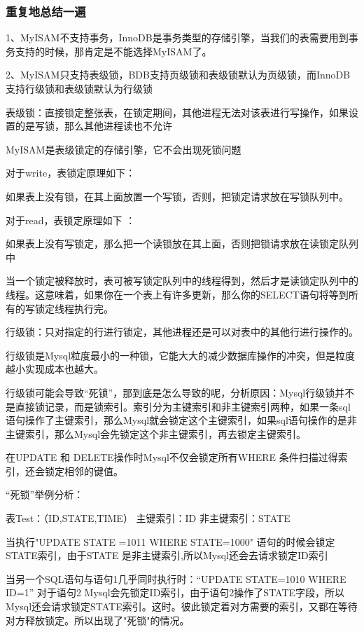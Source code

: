 \documentclass[UTF8]{ctexart}
\begin{document}
 
\subsubsection{重复地总结一遍}

1、MyISAM不支持事务，InnoDB是事务类型的存储引擎，当我们的表需要用到事务支持的时候，那肯定是不能选择MyISAM了。

2、MyISAM只支持表级锁，BDB支持页级锁和表级锁默认为页级锁，而InnoDB支持行级锁和表级锁默认为行级锁
 
表级锁：直接锁定整张表，在锁定期间，其他进程无法对该表进行写操作，如果设置的是写锁，那么其他进程读也不允许
 
MyISAM是表级锁定的存储引擎，它不会出现死锁问题
 
对于write，表锁定原理如下：
 
如果表上没有锁，在其上面放置一个写锁，否则，把锁定请求放在写锁队列中。
 
对于read，表锁定原理如下 ：
 
如果表上没有写锁定，那么把一个读锁放在其上面，否则把锁请求放在读锁定队列中
 
当一个锁定被释放时，表可被写锁定队列中的线程得到，然后才是读锁定队列中的线程。这意味着，如果你在一个表上有许多更新，那么你的SELECT语句将等到所有的写锁定线程执行完。

行级锁：只对指定的行进行锁定，其他进程还是可以对表中的其他行进行操作的。
 
行级锁是Mysql粒度最小的一种锁，它能大大的减少数据库操作的冲突，但是粒度越小实现成本也越大。
 
行级锁可能会导致“死锁”，那到底是怎么导致的呢，分析原因：Mysql行级锁并不是直接锁记录，而是锁索引。索引分为主键索引和非主键索引两种，如果一条sql语句操作了主键索引，那么Mysql就会锁定这个主键索引，如果sql语句操作的是非主键索引，那么Mysql会先锁定这个非主键索引，再去锁定主键索引。
 
在UPDATE 和 DELETE操作时Mysql不仅会锁定所有WHERE 条件扫描过得索引，还会锁定相邻的键值。
 
“死锁”举例分析：
 
表Test：（ID,STATE,TIME）  主键索引：ID  非主键索引：STATE
 
当执行"UPDATE  STATE =1011 WHERE STATE=1000"  语句的时候会锁定STATE索引，由于STATE 是非主键索引,所以Mysql还会去请求锁定ID索引
 
当另一个SQL语句与语句1几乎同时执行时：“UPDATE STATE=1010 WHERE ID=1”  对于语句2 Mysql会先锁定ID索引，由于语句2操作了STATE字段，所以Mysql还会请求锁定STATE索引。这时。彼此锁定着对方需要的索引，又都在等待对方释放锁定。所以出现了"死锁"的情况。
 
\end{document}
